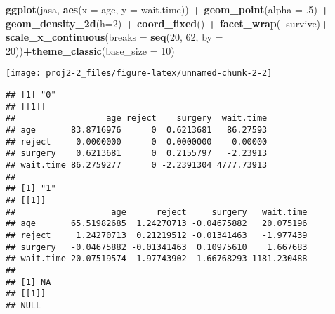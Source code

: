 \documentclass[]{article}
\newenvironment{Shaded}{\begin{snugshade}}{\end{snugshade}}
\newcommand{\ControlFlowTok}[1]{\textcolor[rgb]{0.13,0.29,0.53}{\textbf{#1}}}
\newcommand{\DataTypeTok}[1]{\textcolor[rgb]{0.13,0.29,0.53}{#1}}
\newcommand{\DecValTok}[1]{\textcolor[rgb]{0.00,0.00,0.81}{#1}}
\newcommand{\FloatTok}[1]{\textcolor[rgb]{0.00,0.00,0.81}{#1}}
\newcommand{\KeywordTok}[1]{\textcolor[rgb]{0.13,0.29,0.53}{\textbf{#1}}}
\newcommand{\NormalTok}[1]{#1}
\newcommand{\OperatorTok}[1]{\textcolor[rgb]{0.81,0.36,0.00}{\textbf{#1}}}
\newcommand{\StringTok}[1]{\textcolor[rgb]{0.31,0.60,0.02}{#1}}
\begin{document}
\begin{Shaded}
\begin{Highlighting}[]
\KeywordTok{ggplot}\NormalTok{(jasa, }\KeywordTok{aes}\NormalTok{(}\DataTypeTok{x =}\NormalTok{ age, }\DataTypeTok{y =}\NormalTok{ wait.time)) }\OperatorTok{+}
\StringTok{  }\KeywordTok{geom_point}\NormalTok{(}\DataTypeTok{alpha =} \FloatTok{.5}\NormalTok{) }\OperatorTok{+}\StringTok{ }\KeywordTok{geom_density_2d}\NormalTok{(}\DataTypeTok{h=}\DecValTok{2}\NormalTok{) }\OperatorTok{+}\StringTok{ }\KeywordTok{coord_fixed}\NormalTok{() }\OperatorTok{+}\StringTok{ }\KeywordTok{facet_wrap}\NormalTok{(}\OperatorTok{~}\NormalTok{survive)}\OperatorTok{+}
\StringTok{  }\KeywordTok{scale_x_continuous}\NormalTok{(}\DataTypeTok{breaks =} \KeywordTok{seq}\NormalTok{(}\DecValTok{20}\NormalTok{, }\DecValTok{62}\NormalTok{, }\DataTypeTok{by =} \DecValTok{20}\NormalTok{))}\OperatorTok{+}\KeywordTok{theme_classic}\NormalTok{(}\DataTypeTok{base_size =} \DecValTok{10}\NormalTok{)}
\end{Highlighting}
\end{Shaded}

\begin{center}\texttt{[image: proj2-2\_files/figure-latex/unnamed-chunk-2-2]} \end{center}

\begin{Shaded}
\end{Shaded}

\begin{verbatim}
## [1] "0"
## [[1]]
##                  age reject    surgery  wait.time
## age       83.8716976      0  0.6213681   86.27593
## reject     0.0000000      0  0.0000000    0.00000
## surgery    0.6213681      0  0.2155797   -2.23913
## wait.time 86.2759277      0 -2.2391304 4777.73913
## 
## [1] "1"
## [[1]]
##                   age      reject     surgery   wait.time
## age       65.51982685  1.24270713 -0.04675882   20.075196
## reject     1.24270713  0.21219512 -0.01341463   -1.977439
## surgery   -0.04675882 -0.01341463  0.10975610    1.667683
## wait.time 20.07519574 -1.97743902  1.66768293 1181.230488
## 
## [1] NA
## [[1]]
## NULL
\end{verbatim}
\end{document}
